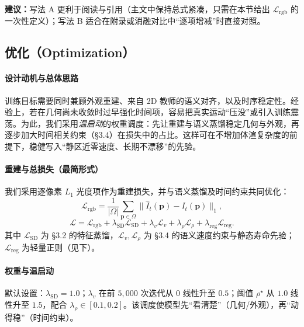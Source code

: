 \documentclass[10pt,conference]{IEEEtran} %
\begin{document}
\noindent\textbf{建议：}写法 A 更利于阅读与引用（主文中保持总式紧凑，只需在本节给出 $\mathcal L_{\mathrm{rgb}}$ 的一次性定义）；写法 B 适合在附录或消融对比中“逐项增减”时直接对照。

\subsection{优化（Optimization）}
\paragraph{设计动机与总体思路}
训练目标需要同时兼顾外观重建、来自 2D 教师的语义对齐，以及时序稳定性。经验上，若在几何尚未收敛时过早强化时间项，容易把真实运动“压没”或引入训练震荡。为此，我们采用\emph{温启动}的权重调度：先让重建与语义蒸馏稳定几何与外观，再逐步加大时间相关约束（§3.4）在损失中的占比。这样可在不增加体渲复杂度的前提下，稳健写入“静区近零速度、长期不漂移”的先验。

\paragraph{重建与总损失（最简形式）}
我们采用逐像素 $L_1$ 光度项作为重建损失，并与语义蒸馏及时间约束共同优化：
\begin{equation}
\mathcal L_{\mathrm{rgb}}
=\frac{1}{|\Omega|}\sum_{\mathbf p\in\Omega}\big\|\hat I_t(\mathbf p)-I_t(\mathbf p)\big\|_1,
\label{eq:opt_lrgb_simple}
\end{equation}
\begin{equation}
\mathcal L=\mathcal L_{\mathrm{rgb}}+\lambda_{\mathrm{SD}}\mathcal L_{\mathrm{SD}}
+\lambda_v \mathcal L_v+\lambda_\rho \mathcal L_\rho+\lambda_{\mathrm{reg}}\mathcal L_{\mathrm{reg}}.
\label{eq:opt_total_simple}
\end{equation}
其中 $\mathcal L_{\mathrm{SD}}$ 为 §3.2 的特征蒸馏，$\mathcal L_v,\mathcal L_\rho$ 为 §3.4 的语义速度约束与静态寿命先验；$\mathcal L_{\mathrm{reg}}$ 为轻量正则（见下）。

\paragraph{权重与温启动}
默认设置：$\lambda_{\mathrm{SD}}{=}1.0$；$\lambda_v$ 在前 $5{,}000$ 次迭代从 $0$ 线性升至 $0.5$；阈值 $\rho^\star$ 从 $1.0$ 线性升至 $1.5$，配合 $\lambda_\rho\!\in[0.1,0.2]$。该调度使模型先“看清楚”（几何/外观），再“动得稳”（时间约束）。
\end{document}
